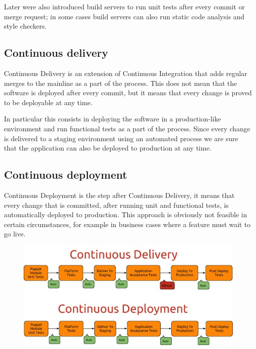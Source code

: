 Later were also introduced build servers to run unit tests after every commit
or merge request; in some cases build servers can also run static code analysis
and style checkers.

\subsection{Continuous delivery}

Continuous Delivery is an extension of Continuous Integration that adds regular
merges to the mainline as a part of the process. This does not mean that the
software is deployed after every commit, but it means that every change is
proved to be deployable at any time.

In particular this consists in deploying the software in a production-like
environment and run functional tests as a part of the process. Since every
change is delivered to a staging environment using an automated process we are
sure that the application can also be deployed to production at any time.

\subsection{Continuous deployment}

Continuous Deployment is the step after Continuous Delivery, it means that
every change that is committed, after running unit and functional tests, is
automatically deployed to production. This approach is obviously not feasible
in certain circumstances, for example in business cases where a feature must
wait to go live.

\begin{figure}[H]
\includegraphics[width=\textwidth,height=\textheight,keepaspectratio]{Introduction/Continuous_Delivery_Continuous_Deployment.jpg}
\end{figure}
